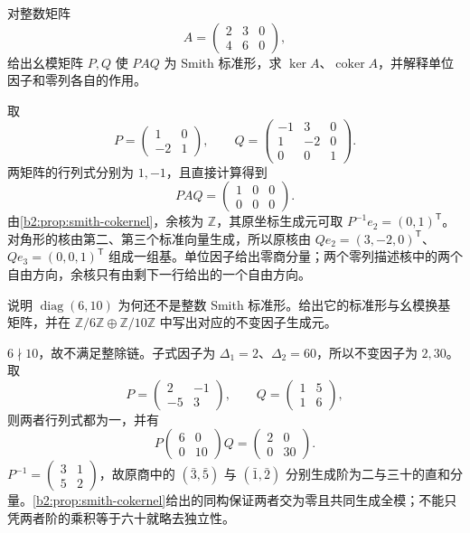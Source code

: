 \begin{exercise}\label{b2:ex:04-rectangular-smith}
	对整数矩阵
	\[
		A=\begin{pmatrix}2&3&0\\4&6&0\end{pmatrix},
	\]
	给出幺模矩阵 \(P,Q\) 使 \(PAQ\) 为 Smith 标准形，求 \(\ker A\)、\(\operatorname{coker}A\)，并解释单位因子和零列各自的作用。
\end{exercise}
\begin{solution}
	取
	\[
		P=\begin{pmatrix}1&0\\-2&1\end{pmatrix},\qquad
		Q=\begin{pmatrix}-1&3&0\\1&-2&0\\0&0&1\end{pmatrix}.
	\]
	两矩阵的行列式分别为 \(1,-1\)，且直接计算得到
	\[
		PAQ=\begin{pmatrix}1&0&0\\0&0&0\end{pmatrix}.
	\]
	由\cref{b2:prop:smith-cokernel}，余核为 \(\mathbb Z\)，其原坐标生成元可取 \(P^{-1}e_2=(0,1)^{\mathsf T}\)。对角形的核由第二、第三个标准向量生成，所以原核由 \(Qe_2=(3,-2,0)^{\mathsf T}\)、\(Qe_3=(0,0,1)^{\mathsf T}\) 组成一组基。单位因子给出零商分量；两个零列描述核中的两个自由方向，余核只有由剩下一行给出的一个自由方向。
\end{solution}

\begin{exercise}\label{b2:ex:04-diagonal-repair}
	说明 \(\operatorname{diag}(6,10)\) 为何还不是整数 Smith 标准形。给出它的标准形与幺模换基矩阵，并在 \(\mathbb Z/6\mathbb Z\oplus\mathbb Z/10\mathbb Z\) 中写出对应的不变因子生成元。
\end{exercise}
\begin{solution}
	\(6\nmid10\)，故不满足整除链。子式因子为 \(\Delta_1=2\)、\(\Delta_2=60\)，所以不变因子为 \(2,30\)。取
	\[
		P=\begin{pmatrix}2&-1\\-5&3\end{pmatrix},\qquad
		Q=\begin{pmatrix}1&5\\1&6\end{pmatrix},
	\]
	则两者行列式都为一，并有
	\[
		P\begin{pmatrix}6&0\\0&10\end{pmatrix}Q
		=\begin{pmatrix}2&0\\0&30\end{pmatrix}.
	\]
	\(P^{-1}=\begin{pmatrix}3&1\\5&2\end{pmatrix}\)，故原商中的 \((\bar3,\bar5)\) 与 \((\bar1,\bar2)\) 分别生成阶为二与三十的直和分量。\cref{b2:prop:smith-cokernel}给出的同构保证两者交为零且共同生成全模；不能只凭两者阶的乘积等于六十就略去独立性。
\end{solution}


